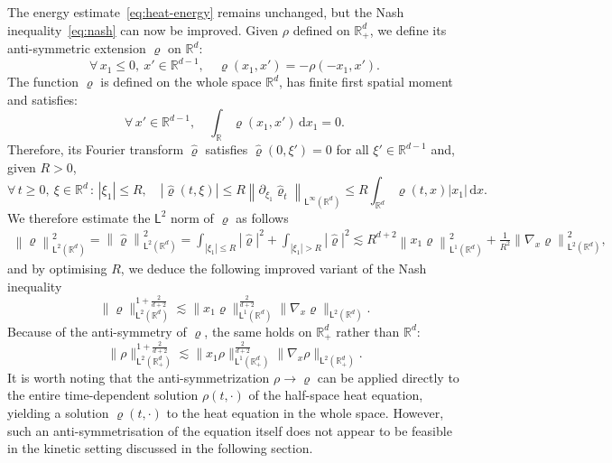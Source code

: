 \documentclass[11pt]{amsart}
\theoremstyle{definition}
\theoremstyle{remark}
\numberwithin{equation}{section}
\newcommand\R{{\mathbb R}}
\newcommand{\dd}{{\, \mathrm d}}
\newcommand{\sfL}{\mathsf{L}}
\begin{document}
The energy estimate~\eqref{eq:heat-energy} remains unchanged, but the Nash inequality~\eqref{eq:nash} can now be improved. Given $\rho$ defined on $  \R_+^d$, we define its anti-symmetric extension $\varrho$ on $  \R^d$:
\begin{equation*}
  \forall \, x_1 \le 0, \ x' \in \R^{d-1}, \quad \varrho(x_1,x') = - \rho (-x_1,x').
\end{equation*}
The function $\varrho$ is defined on the whole space $\R^d$, has finite first spatial moment and satisfies:
\begin{equation}
  \label{eq:zero-averages}
  \forall \, x' \in \R^{d-1}, \quad \int_\R \varrho(x_1,x') \dd x_1 =0.
\end{equation}
Therefore, its Fourier transform $\hat \varrho$ satisfies $\hat \varrho(0,\xi')=0$ for all $\xi' \in \R^{d-1}$ and, given $R>0$,
\begin{equation*}
  \forall \, t \ge 0, \ \xi \in \R^d \, : \, |\xi_1| \le R, \quad |\hat \varrho(t,\xi)| \le R \left\| \partial_{\xi_1} \hat \varrho_t \right\|_{\sfL^{\infty}(\R^d)} \le R \int_{\R^d} \varrho(t,x) |x_1| \dd x.
\end{equation*}
We therefore estimate the $\sfL^{2}$ norm of $\varrho$ as follows
\begin{align*}
  \left\| \varrho \right\|_{\sfL^{2}(\R^d)}^2  = \left\| \hat \varrho \right\|^2_{\sfL^{2}(\R^d)} = \int_{|\xi_1| \le R} |\hat \varrho|^2 + \int_{|\xi_1| > R} |\hat \varrho|^2 
  \lesssim R^{d+2} \left\| x_1 \varrho \right\|_{\sfL^{1}(\R^d)} ^2 + \frac{1}{R^2} \left\| \nabla_x \varrho \right\|_{\sfL^{2}(\R^d)}^2,
\end{align*}
and by optimising $R$, we deduce the following improved variant of the Nash inequality
\begin{equation*}
  \| \varrho \|_{\sfL^{2}(\R^d)} ^{1+\frac{2}{d+2}} \lesssim \| x_1 \varrho \|_{\sfL^{1}(\R^d)}^{\frac{2}{d+2}} \| \nabla_x \varrho \|_{\sfL^{2}(\R^d)}.
\end{equation*}
Because of the anti-symmetry of $\varrho$, the same holds on $\R^d_+$ rather than $\R^d$:
\begin{equation}
  \label{eq:nash-improved-half}
  \| \rho \|_{\sfL^{2}(\R^d_+)} ^{1+\frac{2}{d+2}} \lesssim \| x_1 \rho \|_{\sfL^{1}(\R^d_+)}^{\frac{2}{d+2}} \| \nabla_x \rho \|_{\sfL^{2}(\R^d_+)}.
\end{equation}
It is worth noting that the anti-symmetrization $\rho \to \varrho$ can be applied directly to the entire time-dependent solution $\rho(t, \cdot)$ of the half-space heat equation, yielding a solution $\varrho(t, \cdot)$ to the heat equation in the whole space. However, such an anti-symmetrisation of the equation itself does not appear to be feasible in the kinetic setting discussed in the following section.
\end{document}
